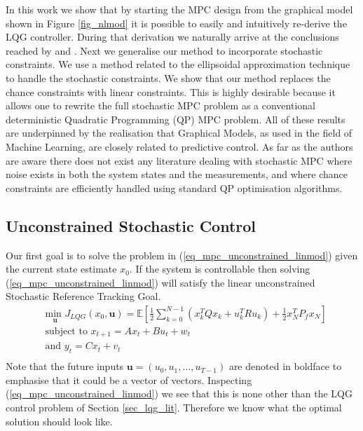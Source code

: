 In this work we show that by starting the MPC design from the graphical model shown in Figure \ref{fig_nlmod} it is possible to easily and intuitively re-derive the LQG controller. During that derivation we naturally arrive at the conclusions reached by \cite{yan1} and \cite{yan2}. Next we generalise our method to incorporate stochastic constraints. We use a method related to the ellipsoidal approximation technique to handle the stochastic constraints. We show that our method replaces the chance constraints with linear constraints. This is highly desirable because it allows one to rewrite the full stochastic MPC problem as a conventional deterministic Quadratic Programming (QP) MPC problem. All of these results are underpinned by the realisation that Graphical Models, as used in the field of Machine Learning, are closely related to predictive control. As far as the authors are aware there does not exist any literature dealing with stochastic MPC where noise exists in both the system states and the measurements, and where chance constraints are efficiently handled using standard QP optimisation algorithms.

\subsection{Unconstrained Stochastic Control}
Our first goal is to solve the problem in (\ref{eq_mpc_unconstrained_linmod}) given the current state estimate $x_0$. If the system is controllable then solving (\ref{eq_mpc_unconstrained_linmod}) will satisfy the linear unconstrained Stochastic Reference Tracking Goal.
\begin{equation}
\begin{aligned}
&\underset{\mathbf{u}}{\text{min }} J_{LQG}(x_0, \mathbf{u}) = \mathbb{E}\left[ \frac{1}{2}\sum_{k=0}^{N-1} \left( x_k^TQx_k + u_k^TRu_k \right) + \frac{1}{2}x_N^TP_fx_N \right] \\
& \text{subject to } x_{t+1}=Ax_t+Bu_t + w_t \\
& \text{and } y_{t}= Cx_t + v_t \\
\end{aligned}
\label{eq_mpc_unconstrained_linmod}
\end{equation}
Note that the future inputs $\mathbf{u}=(u_0, u_1,...,u_{T-1})$ are denoted in boldface to emphasise that it could be a vector of vectors. Inspecting (\ref{eq_mpc_unconstrained_linmod}) we see that this is none other than the LQG control problem of Section \ref{sec_lqg_lit}. Therefore we know what the optimal solution should look like.

